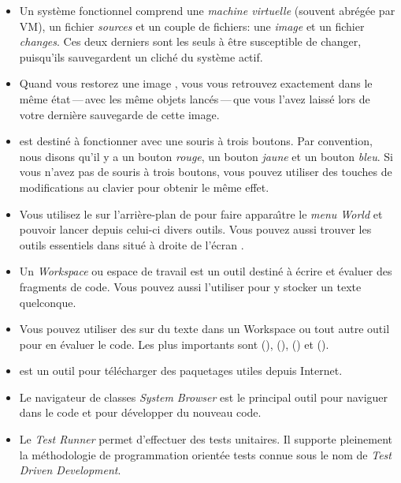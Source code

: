 \documentclass[a4paper,10pt,twoside]{book}
\begin{document}
\begin{itemize}
  \item Un syst\`eme \sq fonctionnel comprend une \emph{machine
      virtuelle} (souvent abr\'eg\'ee par VM), un fichier
    \emph{sources} et un couple de fichiers: une \emph{image} et un
    fichier \emph{changes}. Ces deux derniers sont les seuls \`a
    \^etre susceptible de changer, puisqu'ils sauvegardent un clich\'e
    du syst\`eme actif.
  \item Quand vous restorez une image \sq, vous vous retrouvez
    exactement dans le m\^eme \'etat\,---\,avec les m\^eme objets
    lanc\'es\,---\,que vous l'avez laiss\'e lors de votre derni\`ere
    sauvegarde de cette image.
  \item \sq est destin\'e \`a fonctionner avec une souris \`a trois
    boutons. Par convention, nous disons qu'il y a un bouton \emph{rouge}, un bouton
    \emph{jaune} et un bouton \emph{bleu}. Si vous n'avez pas de
    souris \`a trois boutons, vous pouvez utiliser des touches de
    modifications au clavier pour obtenir le m\^eme effet.
  \item Vous utilisez le  sur l'arri\`ere-plan de
    \sq pour faire appara\^{\i}tre le \emph{menu World} et pouvoir
    lancer depuis celui-ci divers outils. Vous pouvez aussi trouver
    les outils essentiels dans \toolsflapind situ\'e \`a droite de
    l'\'ecran \sq.
  \item Un \emph{Workspace} ou espace de travail est un outil
    destin\'e \`a \'ecrire et \'evaluer des fragments de code. Vous
    pouvez aussi l'utiliser pour y stocker un texte quelconque.
  \item Vous pouvez utiliser des  sur du texte
    dans un Workspace ou tout autre outil pour en
    \'evaluer le code. Les plus importants sont  (),  (),  () et  ().
  \item \sqmap est un outil pour t\'el\'echarger des paquetages utiles
    depuis Internet.
  \item Le navigateur de classes \emph{System Browser} est le
    principal outil pour naviguer dans le code \sq et pour
    d\'evelopper du nouveau code.
  \item Le \emph{Test Runner} permet d'effectuer des tests
    unitaires. Il supporte pleinement la m\'ethodologie de
    programmation orient\'ee tests connue sous le nom de \emph{Test
      Driven Development}.
\end{itemize}

\ifx\wholebook\relax\else 
   
   
\end{document}
